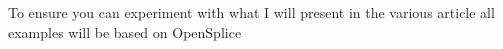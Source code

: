 To ensure you can experiment with what I will present in the various article all 
examples will be based on OpenSplice \cite{DDS:OSPL}